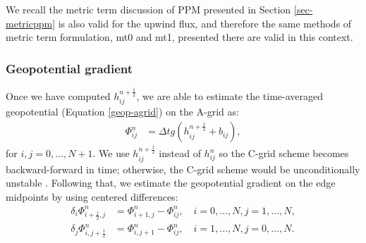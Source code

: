 We recall the metric term discussion of PPM presented in Section \ref{sec-metricppm} is also valid for the upwind flux,
and therefore the same methods of metric term formulation, mt0 and mt1, presented there are valid in this context.

\subsubsection{Geopotential gradient}
Once we have computed $h^{n+\frac{1}{2}}_{ij}$, we are able to estimate the time-averaged geopotential (Equation \eqref{geop-agrid}) on the A-grid as:
\begin{align}
	\label{2d-sw-eq-Cgrid-geo}
	 \Phi^n_{ij} &= \Delta t {g(h^{n+\frac{1}{2}}_{ij} + b_{ij})},
\end{align}
for $i,j=0, \ldots, N+1$.
We use $h^{n+\frac{1}{2}}_{ij}$ instead of $h^{n}_{ij}$ so the C-grid scheme becomes backward-forward in time;
otherwise, the C-grid scheme would be unconditionally unstable \citep{lin:1997}.
Following that, we estimate the geopotential gradient on the edge midpoints by using centered differences:
\begin{align}
	\label{2d-sw-eq-Cgrid-geo-dx}
	\delta_i \Phi^n_{i+\frac{1}{2},j} &= \Phi^{n}_{i+1,j} - \Phi^{n}_{ij},
	\quad i=0,\ldots,N, j=1,\ldots,N,\\
	\label{2d-sw-eq-Cgrid-geo-dy}
	\delta_j \Phi^n_{i,j+\frac{1}{2}} &= \Phi^{n}_{i,j+1} - \Phi^{n}_{ij},
	\quad i=1,\ldots,N, j=0,\ldots,N.
\end{align}
